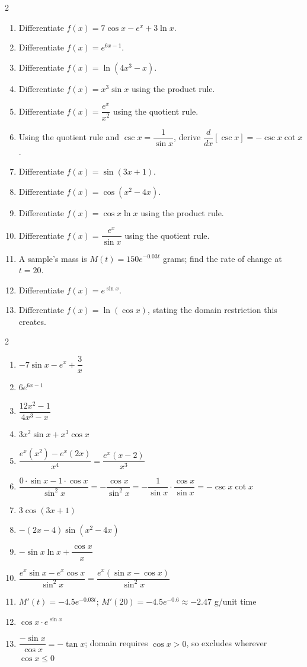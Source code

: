\documentclass[11pt]{article}
\begin{document}
\begin{recapbox}
\begin{multicols}{2}
\small
\begin{enumerate}[leftmargin=*,itemsep=3pt]
  \item Differentiate $f(x)=7\cos x-e^x+3\ln x$.
  \item Differentiate $f(x)=e^{6x-1}$.
  \item Differentiate $f(x)=\ln(4x^3-x)$.
  \item Differentiate $f(x)=x^3\sin x$ using the product rule.
  \item Differentiate $f(x)=\dfrac{e^x}{x^2}$ using the quotient rule.
  \item Using the quotient rule and $\csc x=\dfrac1{\sin x}$, derive $\dfrac{d}{dx}[\csc x]=-\csc x\cot x$.
  \item Differentiate $f(x)=\sin(3x+1)$.
  \item Differentiate $f(x)=\cos(x^2-4x)$.
  \item Differentiate $f(x)=\cos x\ln x$ using the product rule.
  \item Differentiate $f(x)=\dfrac{e^x}{\sin x}$ using the quotient rule.
  \item A sample's mass is $M(t)=150e^{-0.03t}$ grams; find the rate of change at $t=20$.
  \item Differentiate $f(x)=e^{\sin x}$.
  \item Differentiate $f(x)=\ln(\cos x)$, stating the domain restriction this creates.
\end{enumerate}
\end{multicols}
\end{recapbox}

\begin{keybox}
\begin{multicols}{2}
\small
\begin{enumerate}[leftmargin=*,itemsep=3pt]
  \item $-7\sin x-e^x+\dfrac3x$
  \item $6e^{6x-1}$
  \item $\dfrac{12x^2-1}{4x^3-x}$
  \item $3x^2\sin x+x^3\cos x$
  \item $\dfrac{e^x(x^2)-e^x(2x)}{x^4}=\dfrac{e^x(x-2)}{x^3}$
  \item $\dfrac{0\cdot\sin x-1\cdot\cos x}{\sin^2x}=-\dfrac{\cos x}{\sin^2x}=-\dfrac1{\sin x}\cdot\dfrac{\cos x}{\sin x}=-\csc x\cot x$
  \item $3\cos(3x+1)$
  \item $-(2x-4)\sin(x^2-4x)$
  \item $-\sin x\ln x+\dfrac{\cos x}{x}$
  \item $\dfrac{e^x\sin x-e^x\cos x}{\sin^2x}=\dfrac{e^x(\sin x-\cos x)}{\sin^2x}$
  \item $M'(t)=-4.5e^{-0.03t}$; $M'(20)=-4.5e^{-0.6}\approx-2.47$ g/unit time
  \item $\cos x\cdot e^{\sin x}$
  \item $\dfrac{-\sin x}{\cos x}=-\tan x$; domain requires $\cos x>0$, so excludes wherever $\cos x\leq0$
\end{enumerate}
\end{multicols}
\end{keybox}
\end{document}
